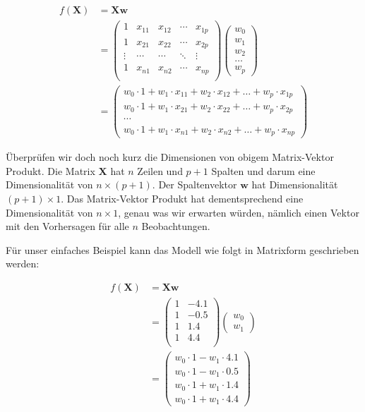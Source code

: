 \documentclass[
]{book}
\begin{document}
\begin{align}
f(\mathbf{X}) &= \mathbf{X}\mathbf{w}\\
&= \begin{pmatrix}
1 & x_{11} & x_{12} & \cdots & x_{1p}\\ 
1 & x_{21} & x_{22} & \cdots & x_{2p}\\
\vdots & \cdots & \cdots & \ddots & \vdots\\
1 & x_{n1} & x_{n2} & \cdots & x_{np}\\
\end{pmatrix}\begin{pmatrix} w_0 \\ w_1 \\ w_2 \\ \dots \\ w_p \end{pmatrix}\\
&= \begin{pmatrix} 
w_0 \cdot 1 + w_1 \cdot x_{11} + w_2 \cdot x_{12} + \dots + w_p \cdot x_{1p} \\
w_0 \cdot 1 + w_1 \cdot x_{21} + w_2 \cdot x_{22} + \dots + w_p \cdot x_{2p} \\ 
\cdots \\ 
w_0 \cdot 1 + w_1 \cdot x_{n1} + w_2 \cdot x_{n2} + \dots + w_p \cdot x_{np}\end{pmatrix}
\end{align}

Überprüfen wir doch noch kurz die Dimensionen von obigem Matrix-Vektor Produkt. Die Matrix \(\mathbf{X}\) hat \(n\) Zeilen und \(p+1\) Spalten und darum eine Dimensionalität von \(n \times (p+1)\). Der Spaltenvektor \(\mathbf{w}\) hat Dimensionalität \((p+1) \times 1\). Das Matrix-Vektor Produkt hat dementsprechend eine Dimensionalität von \(n \times 1\), genau was wir erwarten würden, nämlich einen Vektor mit den Vorhersagen für alle \(n\) Beobachtungen.

Für unser einfaches Beispiel kann das Modell wie folgt in Matrixform geschrieben werden:

\begin{align}
f(\mathbf{X}) &= \mathbf{X}\mathbf{w}\\
&= \begin{pmatrix}
1 & -4.1 \\ 
1 & -0.5 \\
1 & 1.4 \\
1 & 4.4 \\
\end{pmatrix}\begin{pmatrix} w_0 \\ w_1 \end{pmatrix}\\
&= \begin{pmatrix} 
w_0 \cdot 1 - w_1 \cdot 4.1 \\
w_0 \cdot 1 - w_1 \cdot 0.5 \\ 
w_0 \cdot 1 + w_1 \cdot 1.4 \\ 
w_0 \cdot 1 + w_1 \cdot 4.4 \end{pmatrix}
\end{align}
\end{document}

